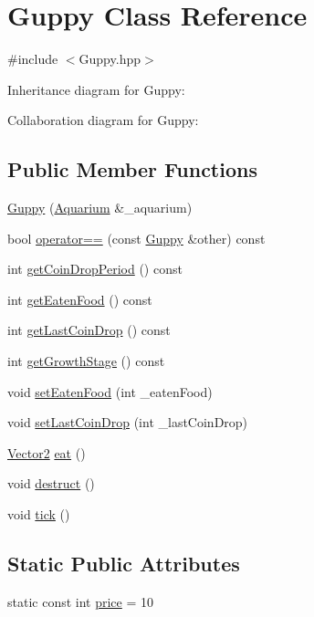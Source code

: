 \hypertarget{class_guppy}{}\section{Guppy Class Reference}
\label{class_guppy}


{\ttfamily \#include $<$Guppy.\+hpp$>$}



Inheritance diagram for Guppy\+:


Collaboration diagram for Guppy\+:
\subsection*{Public Member Functions}
\begin{DoxyCompactItemize}
\item 
\mbox{\hyperlink{class_guppy_a6759d8e672846fcabdfee3df44e06275}{Guppy}} (\mbox{\hyperlink{class_aquarium}{Aquarium}} \&\+\_\+aquarium)
\item 
bool \mbox{\hyperlink{class_guppy_a048b328073ca8bec199c50b41cbc4108}{operator==}} (const \mbox{\hyperlink{class_guppy}{Guppy}} \&other) const
\item 
int \mbox{\hyperlink{class_guppy_a30d6fd06e3960eb1ea078bccdd23e12e}{get\+Coin\+Drop\+Period}} () const
\item 
int \mbox{\hyperlink{class_guppy_a0a57ee7e3bee04fb9dfe261e7f0f551e}{get\+Eaten\+Food}} () const
\item 
int \mbox{\hyperlink{class_guppy_aeb89955aa47fafc160580a6d09363826}{get\+Last\+Coin\+Drop}} () const
\item 
int \mbox{\hyperlink{class_guppy_a786cdeea3d03f342cedaedf85339ba20}{get\+Growth\+Stage}} () const
\item 
void \mbox{\hyperlink{class_guppy_a718281abaf31796884adfe861ca8b491}{set\+Eaten\+Food}} (int \+\_\+eaten\+Food)
\item 
void \mbox{\hyperlink{class_guppy_a39d8082e478435982f05baa6e64b0901}{set\+Last\+Coin\+Drop}} (int \+\_\+last\+Coin\+Drop)
\item 
\mbox{\hyperlink{struct_vector2}{Vector2}} \mbox{\hyperlink{class_guppy_aaeab888b423fd0ea3cc911b974b04f48}{eat}} ()
\item 
void \mbox{\hyperlink{class_guppy_a26bc11223497fef2ae795283a5682407}{destruct}} ()
\item 
void \mbox{\hyperlink{class_guppy_ab2f219fa29b0d22ee9702a55fede519b}{tick}} ()
\end{DoxyCompactItemize}
\subsection*{Static Public Attributes}
\begin{DoxyCompactItemize}
\item 
static const int \mbox{\hyperlink{class_guppy_ab0e5429cdfa8dfaafd56422fe35de0c7}{price}} = 10
\end{DoxyCompactItemize}


